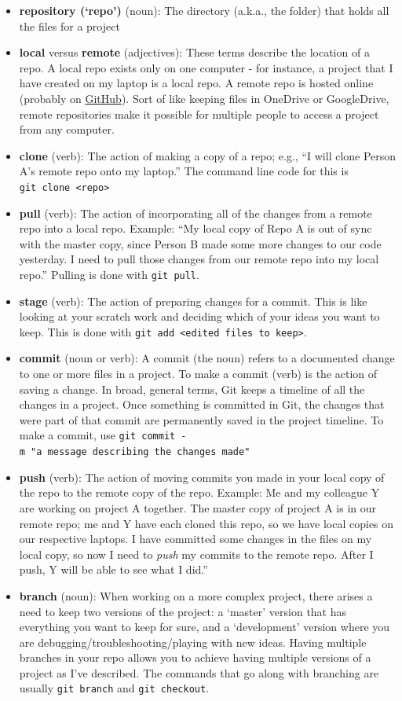 \documentclass[
]{book}
\begin{document}
\begin{itemize}
\item
  \textbf{repository (`repo')} (noun): The directory (a.k.a., the folder) that holds all the files for a project
\item
  \textbf{local} versus \textbf{remote} (adjectives): These terms describe the location of a repo. A local repo exists only on one computer - for instance, a project that I have created on my laptop is a local repo. A remote repo is hosted online (probably on \href{https://github.com/}{GitHub}). Sort of like keeping files in OneDrive or GoogleDrive, remote repositories make it possible for multiple people to access a project from any computer.
\item
  \textbf{clone} (verb): The action of making a copy of a repo; e.g., ``I will clone Person A's remote repo onto my laptop.'' The command line code for this is \texttt{git\ clone\ \textless{}repo\textgreater{}}
\item
  \textbf{pull} (verb): The action of incorporating all of the changes from a remote repo into a local repo. Example: ``My local copy of Repo A is out of sync with the master copy, since Person B made some more changes to our code yesterday. I need to pull those changes from our remote repo into my local repo.'' Pulling is done with \texttt{git\ pull}.
\item
  \textbf{stage} (verb): The action of preparing changes for a commit. This is like looking at your scratch work and deciding which of your ideas you want to keep. This is done with \texttt{git\ add\ \textless{}edited\ files\ to\ keep\textgreater{}}.
\item
  \textbf{commit} (noun or verb): A commit (the noun) refers to a documented change to one or more files in a project. To make a commit (verb) is the action of saving a change. In broad, general terms, Git keeps a timeline of all the changes in a project. Once something is committed in Git, the changes that were part of that commit are permanently saved in the project timeline. To make a commit, use \texttt{git\ commit\ -m\ "a\ message\ describing\ the\ changes\ made"}
\item
  \textbf{push} (verb): The action of moving commits you made in your local copy of the repo to the remote copy of the repo. Example: Me and my colleague Y are working on project A together. The master copy of project A is in our remote repo; me and Y have each cloned this repo, so we have local copies on our respective laptops. I have committed some changes in the files on my local copy, so now I need to \emph{push} my commits to the remote repo. After I push, Y will be able to see what I did.''
\item
  \textbf{branch} (noun): When working on a more complex project, there arises a need to keep two versions of the project: a `master' version that has everything you want to keep for sure, and a `development' version where you are debugging/troubleshooting/playing with new ideas. Having multiple branches in your repo allows you to achieve having multiple versions of a project as I've described. The commands that go along with branching are usually \texttt{git\ branch} and \texttt{git\ checkout}.
\end{itemize}
\end{document}
